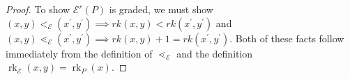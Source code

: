 \documentclass[10 pt]{amsart}
\theoremstyle{plain}
\theoremstyle{definition}
\theoremstyle{remark}
\numberwithin{equation}{section}
\theoremstyle{remark}
\newcommand\rk{\operatorname{rk}}
\begin{document}
\begin{proof}
To show $\mathcal E^r(P)$ is graded, we must show $(x, y) <_{\mathcal E} (x^\prime, y^\prime) \implies rk(x, y)<rk(x^\prime, y^\prime)$ and $(x, y) \lessdot_{\mathcal E} (x^\prime, y^\prime) \implies rk(x, y)+1 = rk(x^\prime , y^\prime)$.  Both of these facts follow immediately from the definition of $\lessdot_{\mathcal E}$ and the definition $\rk_{\mathcal E}(x, y) = \rk_P(x)$.

\end{proof}
\end{document}
